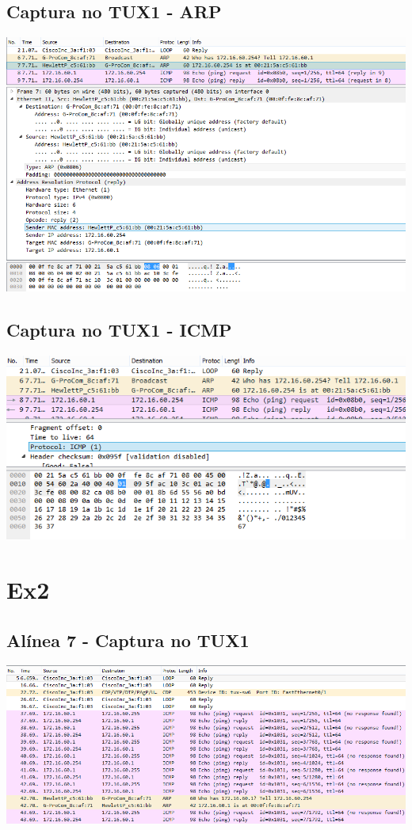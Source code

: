 \documentclass[11pt,a4paper,reqno]{report}
\numberwithin{equation}{section}
\begin{document}
\begin{appendices}
\subsection{Captura no TUX1 - ARP}
\includegraphics[width=18cm]{ex1_arp.png}
\subsection{Captura no TUX1 - ICMP}
\includegraphics[width=18cm]{ex1_icmp.png}

\section{Ex2}
\subsection{Alínea 7 - Captura no TUX1}
\includegraphics[width=18cm]{ex2_a7_tux1.png}

\end{appendices}
\end{document}
